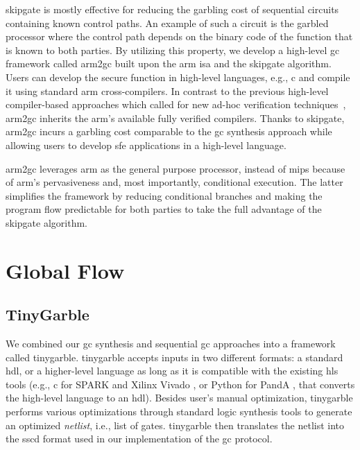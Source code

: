 \gls{skipgate} is mostly effective for reducing the garbling cost of sequential circuits containing known control paths.
An example of such a circuit is the garbled processor where the control path depends on the binary code of the function that is known to both parties.
By utilizing this property, we develop a high-level \acrshort{gc} framework called \gls{arm2gc} built upon the \gls{arm} \acrshort{isa} and the \gls{skipgate} algorithm.
Users can develop the secure function in high-level languages, e.g., \gls{c} and compile it using standard \gls{arm} cross-compilers.
In contrast to the previous high-level compiler-based approaches which called for new ad-hoc verification techniques~\cite{rastogi2014wysteria,demmler2015aby,liu2015oblivm,mood2016frigate}, \gls{arm2gc} inherits the \gls{arm}'s available fully verified compilers.
Thanks to \gls{skipgate}, \gls{arm2gc} incurs a garbling cost comparable to the \acrshort{gc} synthesis approach while allowing users to develop \acrshort{sfe} applications in a high-level language.

\gls{arm2gc} leverages \gls{arm} as the general purpose processor, instead of \gls{mips} because of \gls{arm}'s pervasiveness and, most importantly, conditional execution.
The latter simplifies the framework by reducing conditional branches and making the program flow predictable for both parties to take the full advantage of the \gls{skipgate} algorithm.

\section{Global Flow}
\subsection{TinyGarble}
We combined our \acrshort{gc} synthesis and sequential \acrshort{gc} approaches into a framework called \gls{tinygarble}.
\gls{tinygarble} accepts inputs in two different formats: a standard \acrfull{hdl}, or a higher-level language as long as it is compatible with the existing \acrfull{hls} tools (e.g., \gls{c} for SPARK \cite{Gupta2004} and Xilinx Vivado \cite{tool:Vivado}, or Python for PandA \cite{tool:PandA}, that converts the high-level language to an \acrshort{hdl}).
Besides user's manual optimization, \gls{tinygarble} performs various optimizations through standard logic synthesis tools to generate an optimized \textit{\gls{netlist}}, i.e., list of gates.
\gls{tinygarble} then translates the \gls{netlist} into the \acrfull{sscd} format used in our implementation of the \acrshort{gc} protocol.

